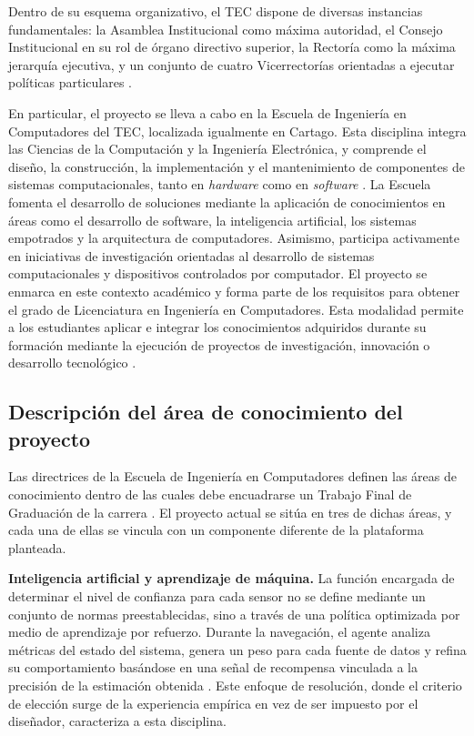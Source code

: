 Dentro de su esquema organizativo, el TEC dispone de diversas instancias fundamentales: la Asamblea Institucional como máxima autoridad, el Consejo Institucional en su rol de órgano directivo superior, la Rectoría como la máxima jerarquía ejecutiva, y un conjunto de cuatro Vicerrectorías orientadas a ejecutar políticas particulares \cite{que_es_el_tec}.


En particular, el proyecto se lleva a cabo en la Escuela de Ingeniería en Computadores del TEC, localizada igualmente en Cartago.
Esta disciplina integra las Ciencias de la Computación y la Ingeniería Electrónica, y comprende el diseño, la construcción, la implementación y el mantenimiento de componentes de sistemas computacionales, tanto en \textit{hardware} como en \textit{software} \cite{ingenieria_computadores}.
La Escuela fomenta el desarrollo de soluciones mediante la aplicación de conocimientos en áreas como el desarrollo de software, la inteligencia artificial, los sistemas empotrados y la arquitectura de computadores. Asimismo, participa activamente en iniciativas de investigación orientadas al desarrollo de sistemas computacionales y dispositivos controlados por computador.
El proyecto se enmarca en este contexto académico y forma parte de los requisitos para obtener el grado de Licenciatura en Ingeniería en Computadores. Esta modalidad permite a los estudiantes aplicar e integrar los conocimientos adquiridos durante su formación mediante la ejecución de proyectos de investigación, innovación o desarrollo tecnológico \cite{tec_lineamientos_tfg}.


\subsection{Descripción del área de conocimiento del proyecto}

Las directrices de la Escuela de Ingeniería en Computadores definen las áreas de conocimiento dentro de las cuales debe encuadrarse un Trabajo Final de Graduación de la carrera \cite{tec_lineamientos_tfg}.
El proyecto actual se sitúa en tres de dichas áreas, y cada una de ellas se vincula con un componente diferente de la plataforma planteada.


\textbf{Inteligencia artificial y aprendizaje de máquina.} La función encargada de determinar el nivel de confianza para cada sensor no se define mediante un conjunto de normas preestablecidas, sino a través de una política optimizada por medio de aprendizaje por refuerzo.
Durante la navegación, el agente analiza métricas del estado del sistema, genera un peso para cada fuente de datos y refina su comportamiento basándose en una señal de recompensa vinculada a la precisión de la estimación obtenida \cite{sutton2018rl}.
Este enfoque de resolución, donde el criterio de elección surge de la experiencia empírica en vez de ser impuesto por el diseñador, caracteriza a esta disciplina.


